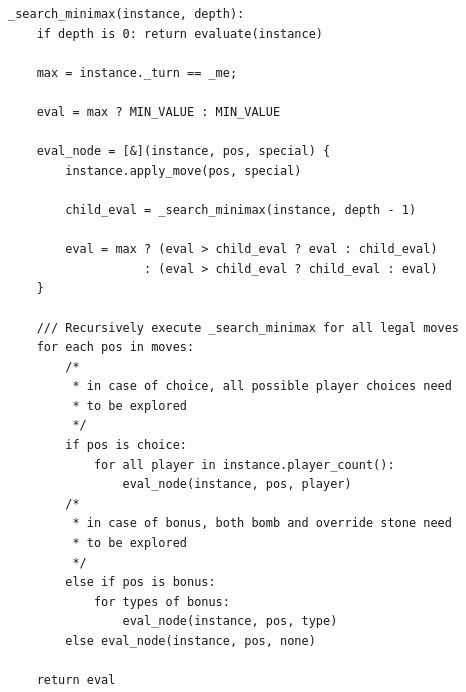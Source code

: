 \begin{lstlisting}
_search_minimax(instance, depth):
    if depth is 0: return evaluate(instance)

    max = instance._turn == _me;
    
    eval = max ? MIN_VALUE : MIN_VALUE
    
    eval_node = [&](instance, pos, special) {
        instance.apply_move(pos, special)

        child_eval = _search_minimax(instance, depth - 1)

        eval = max ? (eval > child_eval ? eval : child_eval)
                   : (eval > child_eval ? child_eval : eval)
    }

    /// Recursively execute _search_minimax for all legal moves
    for each pos in moves:
        /*
         * in case of choice, all possible player choices need
         * to be explored
         */
        if pos is choice:
            for all player in instance.player_count():
                eval_node(instance, pos, player)
        /*
         * in case of bonus, both bomb and override stone need
         * to be explored
         */
        else if pos is bonus:
            for types of bonus:
                eval_node(instance, pos, type)
        else eval_node(instance, pos, none)

    return eval
\end{lstlisting}
